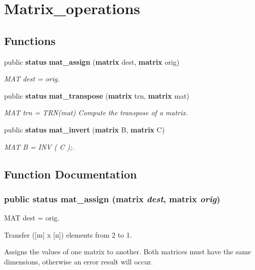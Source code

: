 \section{Matrix\_\-operations}
\label{group__matrix__operations}
\subsection*{Functions}
\begin{CompactItemize}
\item 
public {\bf status} {\bf mat\_\-assign} ({\bf matrix} dest, {\bf matrix} orig)
\begin{CompactList}\small\item\em MAT dest = orig.\item\end{CompactList}\item 
public {\bf status} {\bf mat\_\-transpose} ({\bf matrix} trn, {\bf matrix} mat)
\begin{CompactList}\small\item\em MAT trn = TRN(mat) Compute the transpose of a matrix.\item\end{CompactList}\item 
public {\bf status} {\bf mat\_\-invert} ({\bf matrix} B, {\bf matrix} C)
\begin{CompactList}\small\item\em MAT B = INV ( C );.\item\end{CompactList}\end{CompactItemize}


\subsection{Function Documentation}
\subsubsection{\setlength{\rightskip}{0pt plus 5cm}public {\bf status} mat\_\-assign ({\bf matrix} {\em dest}, {\bf matrix} {\em orig})}\label{group__matrix__operations_a0}


MAT dest = orig.

Transfer ([m] x [n]) elements from 2 to 1.

Assigns the values of one matrix to another. Both matrices must have the same dimensions, otherwise an error result will occur.


